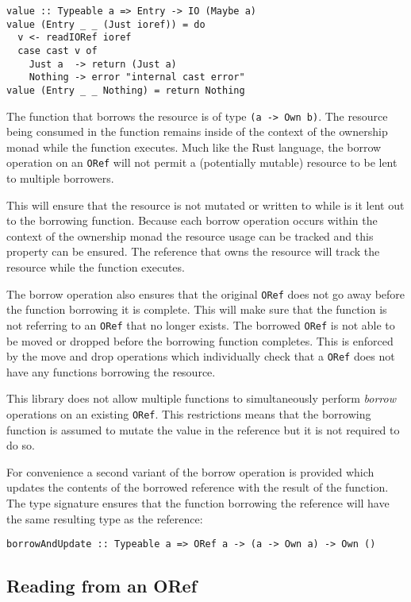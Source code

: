 \documentclass[onehalf,11pt]{beavtex}
\begin{document}
\begin{verbatim}
value :: Typeable a => Entry -> IO (Maybe a)
value (Entry _ _ (Just ioref)) = do
  v <- readIORef ioref
  case cast v of
    Just a  -> return (Just a)
    Nothing -> error "internal cast error"
value (Entry _ _ Nothing) = return Nothing
\end{verbatim}

The function that borrows the resource is of type \texttt{(a -> Own b)}. The
resource being consumed in the function remains inside of the context of the
ownership monad while the function executes.
Much like the Rust language, the borrow operation on an \texttt{ORef} will not
permit a (potentially mutable) resource to be lent to multiple borrowers.

This will ensure that the resource is not mutated or written to while is it lent
out to the borrowing function.
Because each borrow operation occurs within the context of the ownership monad
the resource usage can be tracked and this property can be ensured. The
reference that owns the resource will track the resource while the function
executes.

The borrow operation also ensures that the original \texttt{ORef} does not
go away before the function borrowing it is complete. This will make sure that
the function is not referring to an \texttt{ORef} that no longer exists.
The borrowed \texttt{ORef} is not able to be moved or dropped before the
borrowing function completes.
This is enforced by the move and drop operations which individually
check that a \texttt{ORef} does not have any functions borrowing the resource.

This library does not allow multiple functions to simultaneously perform
\textit{borrow} operations on an existing \texttt{ORef}.
This restrictions means that the borrowing function is assumed to mutate the
value in the reference but it is not required to do so.

For convenience a second variant of the borrow operation is provided which
updates the contents of the borrowed reference with the result of the function. 
The type signature ensures that the function borrowing the reference will
have the same resulting type as the reference:

\begin{verbatim}
borrowAndUpdate :: Typeable a => ORef a -> (a -> Own a) -> Own ()
\end{verbatim}


\subsection{Reading from an ORef}
\end{document}
